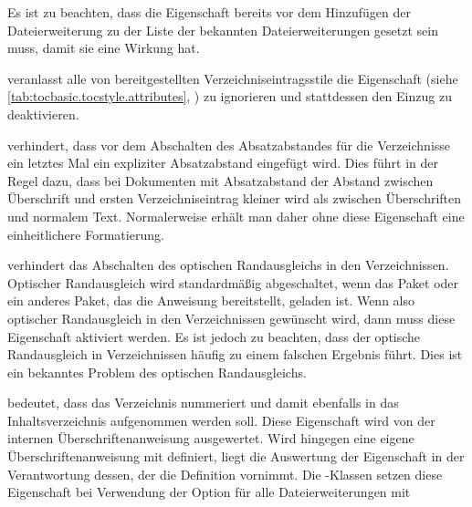\begin{description}
  Es ist zu beachten, dass die Eigenschaft bereits vor dem
  Hinzufügen der Dateierweiterung zu der Liste der bekannten
  Dateierweiterungen gesetzt sein muss, damit sie eine Wirkung hat.
\item[\PValue{noindent}] veranlasst alle
  von \KOMAScript{} bereitgestellten Verzeichniseintragsstile die Eigenschaft
   (siehe \autoref{tab:tocbasic.tocstyle.attributes},
  ) zu ignorieren und
  stattdessen den Einzug zu deaktivieren.
\item[\PValue{noparskipfake}] verhindert,
  dass vor dem Abschalten des Absatzabstandes für die Verzeichnisse ein
  letztes Mal ein expliziter Absatzabstand eingefügt wird. Dies führt in der
  Regel dazu, dass bei Dokumenten mit Absatzabstand der Abstand zwischen
  Überschrift und ersten Verzeichniseintrag kleiner
  wird als zwischen Überschriften und normalem Text. Normalerweise erhält man
  daher ohne diese Eigenschaft eine einheitlichere Formatierung.
\item[\PValue{noprotrusion}] verhindert
  das Abschalten des optischen Randausgleichs in den Verzeichnissen. Optischer
  Randausgleich wird standardmäßig abgeschaltet, wenn das Paket
   oder ein anderes Paket, das die
  Anweisung  bereitstellt,
  geladen ist. Wenn also optischer Randausgleich in den Verzeichnissen
  gewünscht wird, dann muss diese Eigenschaft aktiviert
  werden. Es ist jedoch zu beachten, dass der optische
  Randausgleich in Verzeichnissen häufig zu einem falschen Ergebnis
  führt. Dies ist ein bekanntes Problem des optischen Randausgleichs.
\item[\PValue{numbered}] bedeutet, dass das Verzeichnis nummeriert und damit
  ebenfalls in das Inhaltsverzeichnis aufgenommen werden soll. Diese
  Eigenschaft wird von der internen Überschriftenanweisung ausgewertet. Wird
  hingegen eine eigene Überschriftenanweisung mit
   definiert, liegt die Auswertung der
  Eigenschaft in der Verantwortung dessen, der die Definition vornimmt.  Die
  \KOMAScript-Klassen setzen diese Eigenschaft bei Verwendung der Option
   für alle Dateierweiterungen mit 

\end{description}
